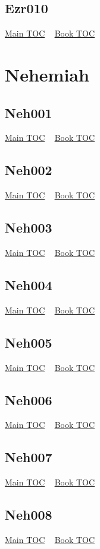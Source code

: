 \documentclass{book}
\begin{document}
  \section{Ezr010}\hyperlink{toc}{Main TOC} ~ \hyperref[subsec:Ezr]{Book TOC} 
  \chapter{Nehemiah} \label{subsec:Neh} \begin{multicols}{2} \minitoc \end{multicols}
  \section{Neh001}\hyperlink{toc}{Main TOC} ~ \hyperref[subsec:Neh]{Book TOC} 
  \section{Neh002}\hyperlink{toc}{Main TOC} ~ \hyperref[subsec:Neh]{Book TOC} 
  \section{Neh003}\hyperlink{toc}{Main TOC} ~ \hyperref[subsec:Neh]{Book TOC} 
  \section{Neh004}\hyperlink{toc}{Main TOC} ~ \hyperref[subsec:Neh]{Book TOC} 
  \section{Neh005}\hyperlink{toc}{Main TOC} ~ \hyperref[subsec:Neh]{Book TOC} 
  \section{Neh006}\hyperlink{toc}{Main TOC} ~ \hyperref[subsec:Neh]{Book TOC} 
  \section{Neh007}\hyperlink{toc}{Main TOC} ~ \hyperref[subsec:Neh]{Book TOC} 
  \section{Neh008}\hyperlink{toc}{Main TOC} ~ \hyperref[subsec:Neh]{Book TOC} 
\end{document}
